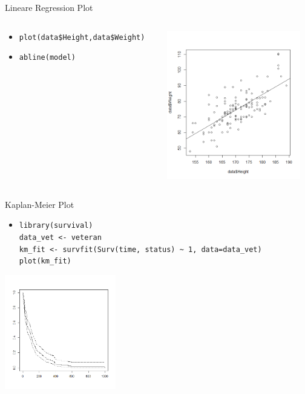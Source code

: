\documentclass[aspectratio = 169]{chariteBeamer}
\begin{document}
\begin{frame}[fragile]{Lineare Regression Plot}
	\begin{columns}[T]
		\begin{column}{0.6\textwidth}
			\begin{itemize}
				\item \verb+plot(data$Height,data$Weight)+
				\item \verb+abline(model)+
			\end{itemize}
		\end{column}
		\begin{column}{0.4\textwidth}
			\includegraphics[height=6.5cm]{LinearRegressionPlot}
		\end{column}
	\end{columns}
\end{frame}

\begin{frame}[fragile]{Kaplan-Meier Plot}
	\begin{itemize}
		\item \verb+library(survival)+ \\ \verb+data_vet <- veteran+ \\ \verb+km_fit <- survfit(Surv(time, status) ~ 1, data=data_vet)+ \\ \verb+plot(km_fit)+
	\end{itemize}
			
	\begin{center}
		\includegraphics[height=5cm]{KM1}
	\end{center}
\end{frame}
\end{document}

